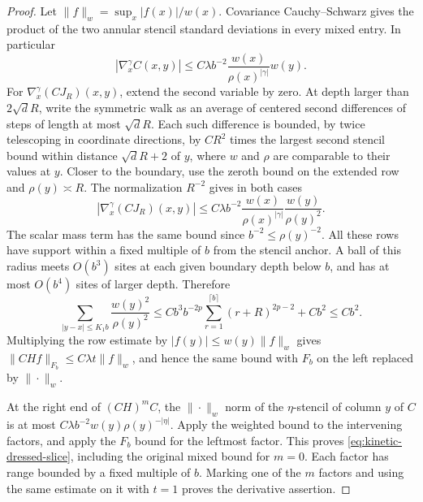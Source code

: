\documentclass[11pt]{article}
\theoremstyle{definition}
\begin{document}
\begin{proof}
Let \(\|f\|_w=\sup_x|f(x)|/w(x)\). Covariance
Cauchy--Schwarz gives the product of the two annular stencil
standard deviations in every mixed entry. In particular
\begin{equation}
 |\nabla_x^\gamma C(x,y)|
 \le C\lambda b^{-2}\frac{w(x)}{\rho(x)^{|\gamma|}}w(y).
\end{equation}
For \(\nabla_x^\gamma(CJ_R)(x,y)\), extend the second
variable by zero. At depth larger than \(2\sqrt d R\),
write the symmetric walk as an average of centered second
differences of steps of length at most \(\sqrt d R\).
Each such difference is bounded, by twice telescoping in
coordinate directions, by \(C R^2\) times the largest
second stencil bound within distance \(\sqrt d R+2\)
of \(y\), where \(w\) and \(\rho\) are comparable to their
values at \(y\). Closer to the boundary, use the zeroth
bound on the extended row and
\(\rho(y)\asymp R\). The normalization \(R^{-2}\) gives
in both cases
\begin{equation}
 |\nabla_x^\gamma(CJ_R)(x,y)|
 \le C\lambda b^{-2}\frac{w(x)}{\rho(x)^{|\gamma|}}
                    \frac{w(y)}{\rho(y)^2}.
\end{equation}
The scalar mass term has the same bound since
\(b^{-2}\le\rho(y)^{-2}\).
All these rows have support within a fixed multiple of \(b\)
from the stencil anchor. A ball of this radius meets
\(O(b^3)\) sites at each given boundary depth below \(b\),
and has at most \(O(b^4)\) sites of larger depth. Therefore
\begin{equation}
 \sum_{|y-x|\le K_1 b}\frac{w(y)^2}{\rho(y)^2}
 \le C b^3 b^{-2p}\sum_{r=1}^{\lceil b\rceil}
            (r+R)^{2p-2}+C b^2\le C b^2.
\end{equation}
Multiplying the row estimate by \(|f(y)|\le w(y)\|f\|_w\)
gives \(\|CH f\|_{F_b}\le C\lambda t\|f\|_w\),
and hence the same bound with \(F_b\) on the left
replaced by \(\|\cdot\|_w\).

At the right end of \((CH)^m C\), the \(\|\cdot\|_w\)
norm of the \(\eta\)-stencil of column \(y\) of \(C\) is
at most \(C\lambda b^{-2}w(y)\rho(y)^{-|\eta|}\).
Apply the weighted bound to the intervening factors, and
apply the \(F_b\) bound for the leftmost factor. This proves
\eqref{eq:kinetic-dressed-slice}, including the original
mixed bound for \(m=0\). Each factor has range bounded
by a fixed multiple of \(b\). Marking one of the \(m\)
factors and using the same estimate on it with \(t=1\)
proves the derivative assertion.


\end{proof}
\end{document}
